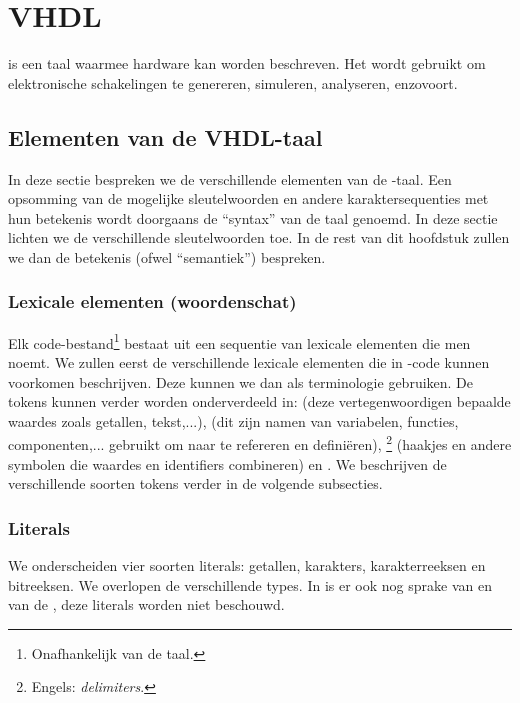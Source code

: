 \chapter{VHDL}
\begin{chapterintro}
\tvhdl{} is een taal waarmee hardware kan worden beschreven. Het wordt gebruikt om elektronische schakelingen te genereren, simuleren, analyseren, enzovoort.
\end{chapterintro}
\minitoc[n]

\section{Elementen van de VHDL-taal}
In deze sectie bespreken we de verschillende elementen van de \tvhdl{}-taal. Een opsomming van de mogelijke sleutelwoorden en andere karaktersequenties met hun betekenis wordt doorgaans de ``syntax'' van de taal genoemd. In deze sectie lichten we de verschillende sleutelwoorden toe. In de rest van dit hoofdstuk zullen we dan de betekenis (ofwel ``semantiek'') bespreken.

\subsection{Lexicale elementen (woordenschat)}
Elk code-bestand\footnote{Onafhankelijk van de taal.} bestaat uit een sequentie van lexicale elementen die men  noemt. We zullen eerst de verschillende lexicale elementen die in \tvhdl{}-code kunnen voorkomen beschrijven. Deze kunnen we dan als terminologie gebruiken. De tokens kunnen verder worden onderverdeeld in:  (deze vertegenwoordigen bepaalde waardes zoals getallen, tekst,...),  (dit zijn namen van variabelen, functies, componenten,... gebruikt om naar te refereren en defini\"eren), \footnote{Engels: \emph{delimiters}.} (haakjes en andere symbolen die waardes en identifiers combineren) en . We beschrijven de verschillende soorten tokens verder in de volgende subsecties.

\subsection{Literals}
We onderscheiden vier soorten literals: getallen, karakters, karakterreeksen en bitreeksen. We overlopen de verschillende types. In \tvhdl{} is er ook nog sprake van  en van de , deze literals worden niet beschouwd.

